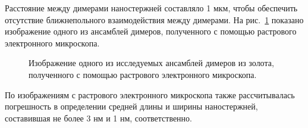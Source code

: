 Расстояние между димерами наностержней составляло 1 мкм, чтобы обеспечить отсутствие ближнепольного взаимодействия между димерами. На рис.~\ref{img:SEMsample} показано изображение одного из ансамблей димеров, полученного с помощью растрового электронного микроскопа.
\begin{figure}[!h]
\caption{Изображение одного из исследуемых ансамблей димеров из золота, полученного с помощью растрового электронного микроскопа.}
\label{img:SEMsample}
\end{figure}
По изображениям с растрового электронного микроскопа также рассчитывалась погрешность в определении средней длины и ширины наностержней, составившая не более 3 нм и 1 нм, соответственно.

